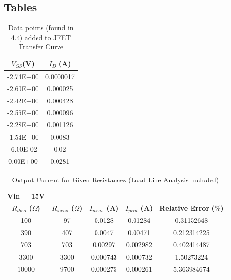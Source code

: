 \documentclass{article}
\begin{document}
\subsection{Tables}
    \begin{table}[H]
    \centering
    \caption{Data points (found in 4.4) added to JFET Transfer Curve}
    \label{my-label}
    \begin{tabular}{cc}
    \textbf{$V_{GS}$(V)} & \textbf{$I_D$ (A)} \\ \hline
    -2.74E+00 & 0.0000017 \\
    -2.60E+00 & 0.000025 \\
    -2.42E+00 & 0.000428 \\
    -2.56E+00 & 0.000096 \\
    -2.28E+00 & 0.001126 \\
    -1.54E+00 & 0.0083 \\
    -6.00E-02 & 0.02 \\
    0.00E+00 & 0.0281
    \end{tabular}
    \end{table}
    \begin{table}[H]
        \centering
        \caption{Output Current for Given Resistances (Load Line Analysis Included)}
        \label{my-label}
        \begin{tabular}{ccccc}
        \textbf{Vin = 15V} & \textbf{} & \textbf{} & \textbf{} & \textbf{} \\
        \textbf{$R_{theo}$ ($\Omega$)} & \textbf{$R_{meas}$ ($\Omega$)} & \textbf{$I_{meas}$ (A)} & \textbf{$I_{pred}$ (A)} & \textbf{Relative Error ($\%$)} \\ \hline
        100 & 97 & 0.0128 & 0.01284 & 0.31152648 \\
        390 & 407 & 0.0047 & 0.00471 & 0.212314225 \\
        703 & 703 & 0.00297 & 0.002982 & 0.402414487 \\
        3300 & 3300 & 0.000743 & 0.000732 & 1.50273224 \\
        10000 & 9700 & 0.000275 & 0.000261 & 5.363984674
        \end{tabular}
    \end{table}
\end{document}
